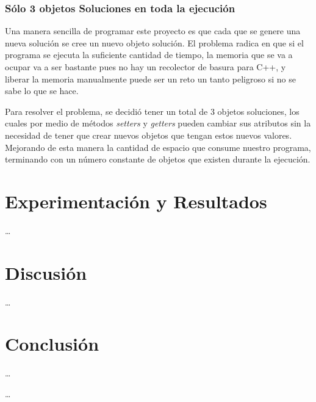\documentclass{article}
\newcommand{\tit}[1]{\textit{#1}}
\begin{document}
  \subsubsection{Sólo 3 objetos Soluciones en toda la ejecución}
  Una manera sencilla de programar este proyecto es que cada 
  que se genere una nueva solución se cree un nuevo objeto 
  solución. El problema radica en que si el programa se ejecuta 
  la suficiente cantidad de tiempo, la memoria que se va a 
  ocupar va a ser bastante pues no hay un recolector de basura 
  para C++, y liberar la memoria manualmente puede ser un reto 
  un tanto peligroso si no se sabe lo que se hace.

  Para resolver el problema, se decidió tener un total de 
  3 objetos soluciones, los cuales por medio de métodos
  \tit{setters} y \tit{getters} pueden cambiar sus atributos 
  sin la necesidad de tener que crear nuevos objetos
  que tengan estos nuevos valores. Mejorando de esta manera
  la cantidad de espacio que consume nuestro programa, terminando 
  con un número constante de objetos que existen durante la 
  ejecución.

  \section{Experimentación y Resultados} \label{results}
  \ldots

  \section{Discusión} \label{discussion}
  \ldots

  \section{Conclusión} \label{conclusion}
  \ldots

  \begin{thebibliography}{9}

     \ldots

  \end{thebibliography}
\end{document}
